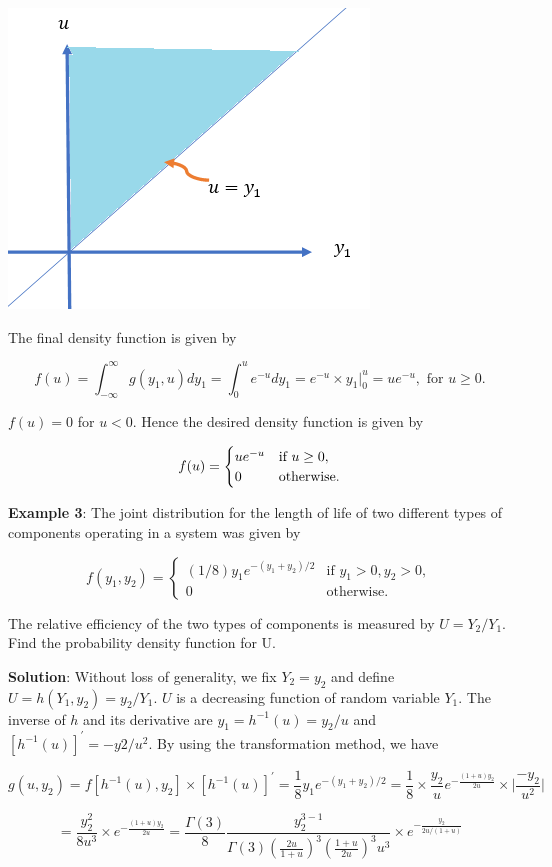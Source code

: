 \documentclass[
]{book}
\begin{document}
\begin{center}\includegraphics[width=0.4\linewidth]{topic11/example2Domain} \end{center}

The final density function is given by

\[
f(u) = \int_{-\infty}^\infty g(y_1,u)dy_1 = \int_0^u e^{-u}dy_1 = e^{-u}\times y_1\Bigg|_0^u = ue^{-u}, \text { for } u \ge 0.
\]

\(f(u)=0\) for \(u < 0\). Hence the desired density function is given by

\[
\displaystyle f( u) = \begin{cases} 
 ue^{-u} & \text{if $ u \ge 0$}, \\  
 0 & \text{otherwise}.
 \end{cases}
\]

\textbf{\color{red} Example 3}: The joint distribution for the length of life of two different types of components operating in a system was given by

\[
\displaystyle f(y_1,y_2) = \begin{cases} 
 (1/8)y_1e^{-(y_1+y_2)/2} & \text{if $y_1 > 0, y_2 > 0$}, \\  
 0 & \text{otherwise}.
 \end{cases}
\]

The relative efficiency of the two types of components is measured by \(U = Y_2/Y_1\). Find the probability density function for U.

\textbf{Solution}: Without loss of generality, we fix \(Y_2 = y_2\) and define \(U = h(Y_1, y_2) = y_2/Y_1\). \(U\) is a decreasing function of random variable \(Y_1\). The inverse of \(h\) and its derivative are \(y_1 = h^{-1}(u) = y_2/u\) and \([h^{-1}(u)]^\prime = -y2/u^2\). By using the transformation method, we have

\[
g(u, y_2) = f[h^{-1}(u), y_2]\times [h^{-1}(u)]^\prime = \frac{1}{8}y_1e^{-(y_1+y_2)/2} = \frac{1}{8}\times \frac{y_2}{u}e^{-\frac{(1+u)y_2}{2u}}\times \Bigg|\frac{-y_2}{u^2}\Bigg| 
\]

\[
= \frac{y^2_2}{8u^3}\times e^{-\frac{(1+u)y_2}{2u}} = \frac{\Gamma(3)}{8}\frac{y_2^{3-1}}{\Gamma(3)  \left(\frac{2u}{1+u} \right)^3 \left(\frac{1+u}{2u} \right)^3 u^3}\times e^{-\frac{y_2}{2u/(1+u)}} 
\]
\end{document}
